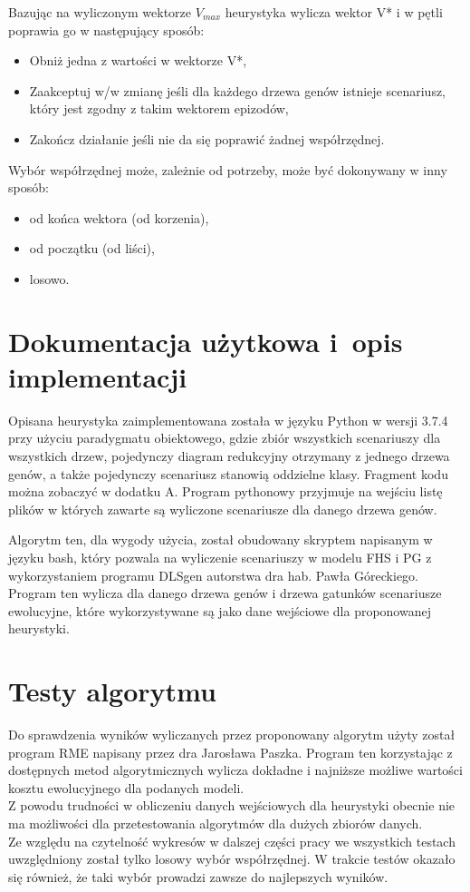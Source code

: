 \documentclass[licencjacka]{pracamgr}
\begin{document}
Bazując na wyliczonym wektorze $V_{max}$ heurystyka wylicza wektor V* i w pętli poprawia go w następujący sposób:
\begin{itemize}
\item Obniż jedna z wartości w wektorze V*,
\item Zaakceptuj w/w zmianę jeśli dla każdego drzewa genów istnieje scenariusz, który jest zgodny z takim wektorem epizodów,
\item Zakończ działanie jeśli nie da się poprawić żadnej współrzędnej.
\end{itemize}
Wybór współrzędnej może, zależnie od potrzeby, może być dokonywany w inny sposób:
\begin{itemize}
\item od końca wektora (od korzenia),
\item od początku (od liści),
\item losowo.
\end{itemize}

\section{Dokumentacja użytkowa i~opis implementacji}\label{r:impl}
Opisana heurystyka zaimplementowana została w języku Python w wersji 3.7.4 przy użyciu paradygmatu obiektowego, gdzie zbiór wszystkich scenariuszy dla wszystkich drzew, pojedynczy diagram redukcyjny otrzymany z jednego drzewa genów, a także pojedynczy scenariusz stanowią oddzielne klasy. Fragment kodu można zobaczyć w dodatku A. Program pythonowy przyjmuje na wejściu listę plików w których zawarte są wyliczone scenariusze dla danego drzewa genów.

Algorytm ten, dla wygody użycia, został obudowany skryptem napisanym w języku bash, który pozwala na wyliczenie scenariuszy w modelu FHS i PG z wykorzystaniem programu DLSgen autorstwa dra hab. Pawła Góreckiego.\cite{dlsgen} Program ten wylicza dla danego drzewa genów i drzewa gatunków scenariusze ewolucyjne, które wykorzystywane są jako dane wejściowe dla proponowanej heurystyki.


\section{Testy algorytmu}
Do sprawdzenia wyników wyliczanych przez proponowany algorytm użyty został program RME napisany przez dra Jarosława Paszka. Program ten korzystając z dostępnych metod algorytmicznych wylicza dokładne i najniższe możliwe wartości kosztu ewolucyjnego dla podanych modeli. \cite{rme}
\\
Z powodu trudności w obliczeniu danych wejściowych dla heurystyki obecnie nie ma możliwości dla przetestowania algorytmów dla dużych zbiorów danych.
\\
Ze względu na czytelność wykresów w dalszej części pracy we wszystkich testach uwzględniony został tylko losowy wybór współrzędnej. W trakcie testów okazało się również, że taki wybór prowadzi zawsze do najlepszych wyników. 
\end{document}
